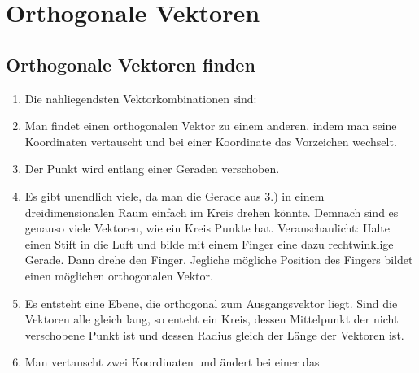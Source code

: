 


\section{Orthogonale Vektoren}
\subsection{Orthogonale Vektoren finden}
\begin{enumerate}
\item Die nahliegendsten Vektorkombinationen sind:
\item Man findet einen orthogonalen Vektor zu einem anderen, indem man 
  seine Koordinaten vertauscht und bei einer Koordinate das Vorzeichen
  wechselt. 
\item Der Punkt wird entlang einer Geraden verschoben.
\item Es gibt unendlich viele, da man die Gerade aus 3.) in einem
  dreidimensionalen Raum einfach im Kreis drehen könnte. Demnach sind
  es genauso viele Vektoren, wie ein Kreis Punkte
  hat. Veranschaulicht: Halte einen Stift in die Luft und bilde mit
  einem Finger eine dazu rechtwinklige Gerade. Dann drehe den
  Finger. Jegliche mögliche Position des Fingers bildet einen
  möglichen orthogonalen Vektor. 
\item Es entsteht eine Ebene, die orthogonal zum Ausgangsvektor
  liegt. Sind die Vektoren alle gleich lang, so enteht ein Kreis,
  dessen Mittelpunkt der nicht verschobene Punkt ist und dessen
  Radius gleich der Länge der Vektoren ist.
\item Man vertauscht zwei Koordinaten und ändert bei einer das

\end{enumerate}
